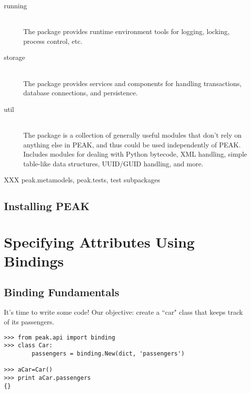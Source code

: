 \begin{description}
\item[running] \hfill \\ 
The  package provides runtime environment tools for
logging, locking, process control, etc.

\item[storage] \hfill \\ 
The  package provides services and components for
handling transactions, database connections, and persistence.

\item[util] \hfill \\ 
The  package is a collection of generally useful modules
that don't rely on anything else in PEAK, and thus could be used
independently of PEAK.  Includes modules for dealing with Python bytecode,
XML handling, simple table-like data structures, UUID/GUID handling, and more.

\end{description}

XXX peak.metamodels, peak.tests, test subpackages



\subsection{Installing PEAK}

\newpage











\section{Specifying Attributes Using Bindings}

\subsection{Binding Fundamentals}

It's time to write some code!  Our objective: create a ``car" class 
that keeps track of its passengers.

\begin{verbatim}
>>> from peak.api import binding
>>> class Car:
        passengers = binding.New(dict, 'passengers')
	
>>> aCar=Car()
>>> print aCar.passengers
{}

\end{verbatim}

